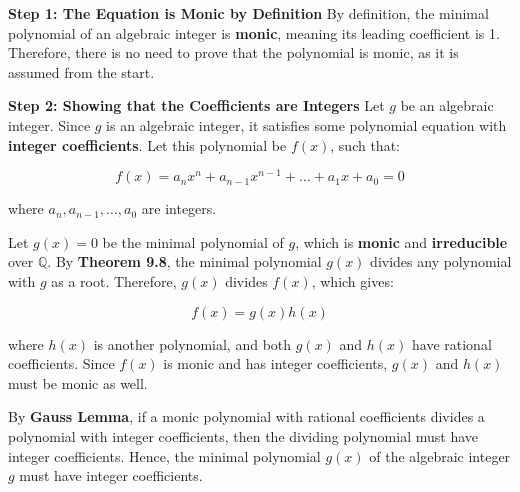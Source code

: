 \documentclass{article}
\newenvironment{proofbox}
  {\begin{mdframed}[linewidth=1pt,linecolor=black,backgroundcolor=white]\noindent\ignorespaces}
  {\end{mdframed}}
\begin{document}
\begin{proofbox}

    \textbf{Step 1: The Equation is Monic by Definition}
    By definition, the minimal polynomial of an algebraic integer is \textbf{monic}, meaning its leading coefficient is 1. Therefore, there is no need to prove that the polynomial is monic, as it is assumed from the start.
    
    \textbf{Step 2: Showing that the Coefficients are Integers}
    Let \( g \) be an algebraic integer. Since \( g \) is an algebraic integer, it satisfies some polynomial equation with \textbf{integer coefficients}. Let this polynomial be \( f(x) \), such that:
    
    \[
    f(x) = a_n x^n + a_{n-1} x^{n-1} + \dots + a_1 x + a_0 = 0
    \]
    
    where \( a_n, a_{n-1}, \dots, a_0 \) are integers.
    
    Let \( g(x) = 0 \) be the minimal polynomial of \( g \), which is \textbf{monic} and \textbf{irreducible} over \( \mathbb{Q} \). By \textbf{Theorem 9.8}, the minimal polynomial \( g(x) \) divides any polynomial with \( g \) as a root. Therefore, \( g(x) \) divides \( f(x) \), which gives:
    
    \[
    f(x) = g(x) h(x)
    \]
    
    where \( h(x) \) is another polynomial, and both \( g(x) \) and \( h(x) \) have rational coefficients. Since \( f(x) \) is monic and has integer coefficients, \( g(x) \) and \( h(x) \) must be monic as well.
    
     By \textbf{Gauss Lemma}, if a monic polynomial with rational coefficients divides a polynomial with integer coefficients, then the dividing polynomial must have integer coefficients. Hence, the minimal polynomial \( g(x) \) of the algebraic integer \( g \) must have integer coefficients.
\end{proofbox}

\end{document}
